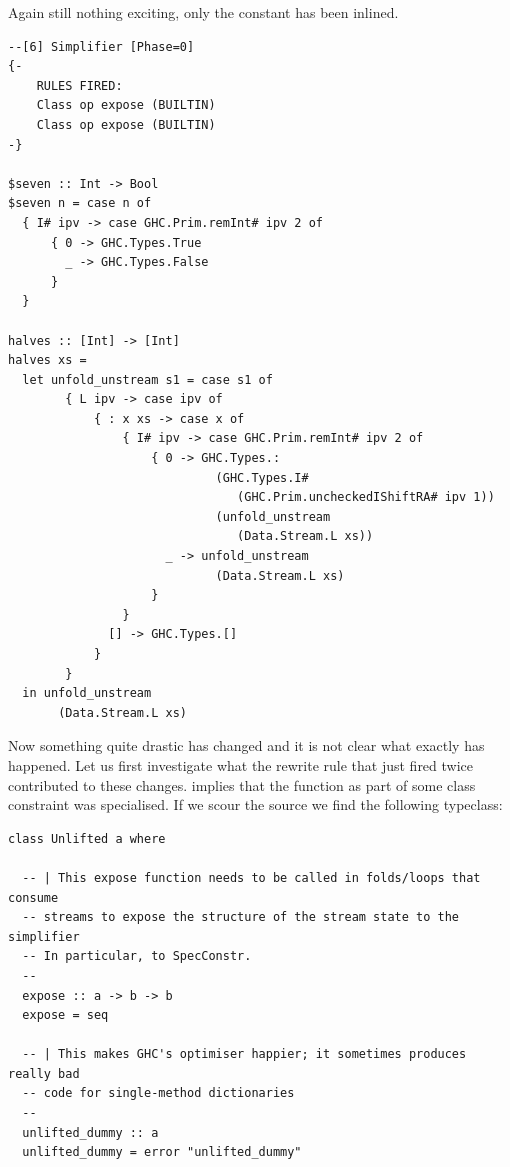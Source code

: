 Again still nothing exciting, only the  constant has been inlined.

\begin{listing}[H]
\begin{verbatim}
--[6] Simplifier [Phase=0]
{-
    RULES FIRED:
    Class op expose (BUILTIN)
    Class op expose (BUILTIN)
-}

$seven :: Int -> Bool
$seven n = case n of
  { I# ipv -> case GHC.Prim.remInt# ipv 2 of
      { 0 -> GHC.Types.True
        _ -> GHC.Types.False
      }
  }

halves :: [Int] -> [Int]
halves xs = 
  let unfold_unstream s1 = case s1 of
        { L ipv -> case ipv of
            { : x xs -> case x of
                { I# ipv -> case GHC.Prim.remInt# ipv 2 of
                    { 0 -> GHC.Types.:
                             (GHC.Types.I#
                                (GHC.Prim.uncheckedIShiftRA# ipv 1))
                             (unfold_unstream
                                (Data.Stream.L xs))
                      _ -> unfold_unstream
                             (Data.Stream.L xs)
                    }
                }
              [] -> GHC.Types.[]
            }
        }
  in unfold_unstream
       (Data.Stream.L xs)
\end{verbatim}
\end{listing}

Now something quite drastic has changed and it is not clear what exactly has happened. Let us first investigate
what the rewrite rule that just fired twice contributed to these changes.  implies that the 
function  as part of some class constraint was specialised. If we scour the source we find the following
typeclass:

\begin{listing}[H]
\begin{verbatim}
class Unlifted a where

  -- | This expose function needs to be called in folds/loops that consume
  -- streams to expose the structure of the stream state to the simplifier
  -- In particular, to SpecConstr.
  --
  expose :: a -> b -> b
  expose = seq

  -- | This makes GHC's optimiser happier; it sometimes produces really bad
  -- code for single-method dictionaries
  --
  unlifted_dummy :: a
  unlifted_dummy = error "unlifted_dummy"
\end{verbatim}
\end{listing}

